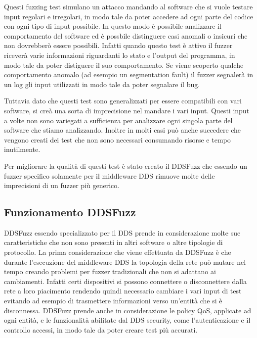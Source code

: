 Questi fuzzing test simulano un attacco mandando al software
che si vuole testare input regolari e irregolari, 
in modo tale da poter 
accedere ad ogni parte del codice con ogni tipo di input possibile.
In questo modo è possibile analizzare il comportamento del software
ed è possbile distinguere casi anomali o insicuri che non dovrebberò
essere possibili. Infatti quando questo test è attivo il fuzzer riceverà
varie informazioni riguardanti lo stato e l'output del programma, in 
modo tale da poter distiguere il suo comportamento. Se viene scoperto
qualche comportamento anomalo (ad esempio un segmentation fault) il 
fuzzer segnalerà in un log gli input utilizzati in modo tale da poter 
segnalare il bug.

Tuttavia dato che questi test sono generalizzati per essere compatibili
con vari software, si creà una sorta di imprecisione nel mandare i vari 
input. Questi input a volte non sono variegati a sufficienza 
per analizzare ogni singola parte del software che stiamo analizzando.
Inoltre in molti casi può anche succedere che vengono creati
dei test che non sono necessari consumando risorse e tempo inutilmente.

Per migliorare la qualità di questi test è stato 
creato il DDSFuzz che essendo un fuzzer specifico solamente per 
il middleware DDS rimuove molte delle imprecisioni di un fuzzer 
più generico.

\subsection{Funzionamento DDSFuzz}
DDSFuzz essendo specializzato per il DDS prende in considerazione 
molte sue caratteristiche che non sono presenti in altri software o 
altre tipologie di protocollo. La prima considerazione che viene 
effettuata da DDSFuzz è che durante l'esecuzione del middleware DDS 
la topologia della rete può mutare nel tempo creando problemi per 
fuzzer tradizionali che non si adattano ai cambiamenti. Infatti certi
dispositivi si possono connettere o disconnettere dalla rete a loro 
piacimento rendendo quindi necessario cambiare i vari input di test 
evitando ad esempio di trasmettere informazioni verso un'entità 
che si è disconnessa. DDSFuzz prende anche in considerazione le
policy QoS, applicate ad ogni entità, e 
le funzionalità abilitate dal DDS security, come
l'autenticazione e il controllo accessi, in modo tale da
poter creare test più accurati. 